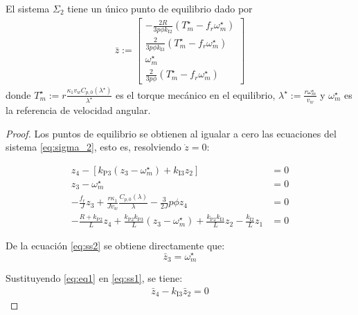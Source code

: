 \begin{lemma}\label{lem:sigma_2_eq}
    El sistema $\Sigma_2$ tiene un único punto de equilibrio dado por
	\begin{align}\label{barz}
	\bar{z} :=
		\begin{bmatrix}
			-\frac{2R}{3p\phi k_{\textrm{I2}}}(T^\star_m - f_r\omega^\star_m) \\[0.3cm]
			\frac{2}{3p\phi k_{\textrm{I3}}}(T^\star_m - f_r\omega^\star_m) \\[0.3cm]
			\omega^\star_m \\[0.3cm]
			\frac{2}{3p\phi}(T^\star_m - f_r\omega^\star_m)
	\end{bmatrix}
	\end{align}
    donde $T^\star_m := r\frac{\kappa_1 v_w C_{p,0}(\lambda^\star)}{\lambda^\star}$ es el torque mecánico en el 
    equilibrio, $\lambda^\star := \frac{r\omega_m^\star}{v_w}$ y $\omega_m^\star$ es la referencia de velocidad 
    angular.

    \tripletriang

    \begin{proof}
        Los puntos de equilibrio se obtienen al igualar a cero las ecuaciones del sistema \eqref{eq:sigma_2}, esto es, resolviendo $\dot{z} = 0$:

        \begin{align}
        z_4 - [k_{\textrm{P3}}(z_3 - \omega^\star_m) + k_{\textrm{I3}}z_2] &= 0 \label{eq:ss1} \\
        z_3 - \omega^\star_m &= 0 \label{eq:ss2} \\
        -\frac{f_r}{J}z_3 + \frac{r\kappa_1}{Jv_w}\frac{C_{p,0}(\lambda)}{\lambda} - \frac{3}{2J}p\phi z_4 &= 0 \label{eq:ss3} \\
        -\frac{R+k_{\textrm{P2}}}{L}z_4 + \frac{k_{\textrm{P2}}k_{\textrm{P3}}}{L}(z_3 - \omega^\star_m) + \frac{k_{\textrm{P2}}k_{\textrm{I3}}}{L}z_2 - \frac{k_{\textrm{I2}}}{L}z_1 &= 0 \label{eq:ss4}
        \end{align}

        De la ecuación \eqref{eq:ss2} se obtiene directamente que:
        \begin{equation}
        \bar{z}_3 = \omega^\star_m \label{eq:eq1}
        \end{equation}

        Sustituyendo \eqref{eq:eq1} en \eqref{eq:ss1}, se tiene:
        \begin{align}
        \bar{z}_4 - k_{\textrm{I3}}\bar{z}_2 = 0 \label{eq:eq2}
        \end{align}


\end{proof}
\end{lemma}
